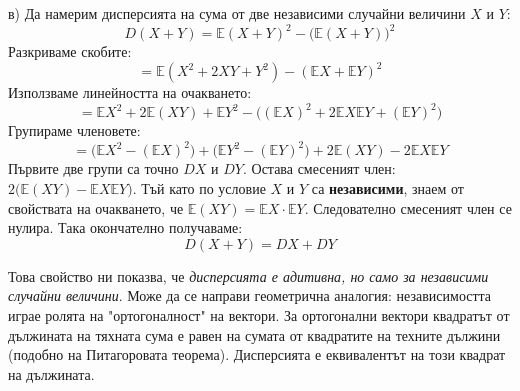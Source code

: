 \documentclass{article}
\begin{document}
в) Да намерим дисперсията на сума от две независими случайни величини $X$ и $Y$:
\[ D(X + Y) = \mathbb{E}(X + Y)^2 - \big(\mathbb{E}(X + Y)\big)^2 \]
Разкриваме скобите:
\[ = \mathbb{E}(X^2 + 2XY + Y^2) - (\mathbb{E}X + \mathbb{E}Y)^2 \]
Използваме линейността на очакването:
\[ = \mathbb{E}X^2 + 2\mathbb{E}(XY) + \mathbb{E}Y^2 - \Big( (\mathbb{E}X)^2 + 2\mathbb{E}X\mathbb{E}Y + (\mathbb{E}Y)^2 \Big) \]
Групираме членовете:
\[ = \Big( \mathbb{E}X^2 - (\mathbb{E}X)^2 \Big) + \Big( \mathbb{E}Y^2 - (\mathbb{E}Y)^2 \Big) + 2\mathbb{E}(XY) - 2\mathbb{E}X\mathbb{E}Y \]
Първите две групи са точно $DX$ и $DY$. Остава смесеният член: $2\big(\mathbb{E}(XY) - \mathbb{E}X\mathbb{E}Y\big)$.
Тъй като по условие $X$ и $Y$ са \textbf{независими}, знаем от свойствата на очакването, че $\mathbb{E}(XY) = \mathbb{E}X \cdot \mathbb{E}Y$. Следователно смесеният член се нулира. Така окончателно получаваме:
\[ D(X + Y) = DX + DY \]

Това свойство ни показва, че \textit{дисперсията е адитивна, но само за независими случайни величини}. Може да се направи геометрична аналогия: независимостта играе ролята на "ортогоналност" на вектори. За ортогонални вектори квадратът от дължината на тяхната сума е равен на сумата от квадратите на техните дължини (подобно на Питагоровата теорема). Дисперсията е еквивалентът на този квадрат на дължината.
\end{document}
